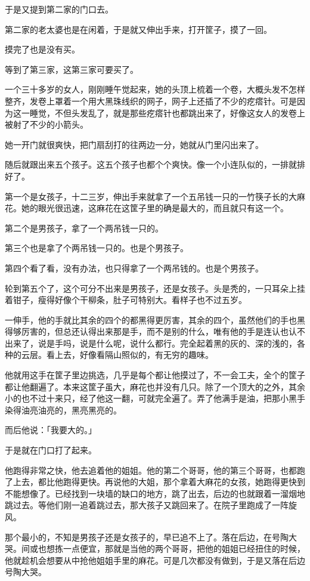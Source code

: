 \documentclass[UTF8]{ctexart}
\begin{document}
于是又提到第二家的门口去。

第二家的老太婆也是在闲着，于是就又伸出手来，打开筐子，摸了一回。

摸完了也是没有买。

等到了第三家，这第三家可要买了。

一个三十多岁的女人，刚刚睡午觉起来，她的头顶上梳着一个卷，大概头发不怎样整齐，发卷上罩着一个用大黑珠线织的网子，网子上还插了不少的疙瘩针。可是因为这一睡觉，不但头发乱了，就是那些疙瘩针也都跳出来了，好像这女人的发卷上被射了不少的小箭头。

她一开门就很爽快，把门扇刮打的往两边一分，她就从门里闪出来了。

随后就跟出来五个孩子。这五个孩子也都个个爽快。像一个小连队似的，一排就排好了。

第一个是女孩子，十二三岁，伸出手来就拿了一个五吊钱一只的一竹筷子长的大麻花。她的眼光很迅速，这麻花在这筐子里的确是最大的，而且就只有这一个。

第二个是男孩子，拿了一个两吊钱一只的。

第三个也是拿了个两吊钱一只的。也是个男孩子。

第四个看了看，没有办法，也只得拿了一个两吊钱的。也是个男孩子。

轮到第五个了，这个可分不出来是男孩子，还是女孩子。头是秃的，一只耳朵上挂着钳子，瘦得好像个干柳条，肚子可特别大。看样子也不过五岁。

一伸手，他的手就比其余的四个的都黑得更厉害，其余的四个，虽然他们的手也黑得够厉害的，但总还认得出来那是手，而不是别的什么，唯有他的手是连认也认不出来了，说是手吗，说是什么呢，说什么都行。完全起着黑的灰的、深的浅的，各种的云层。看上去，好像看隔山照似的，有无穷的趣味。

他就用这手在筐子里边挑选，几乎是每个都让他摸过了，不一会工夫，全个的筐子都让他翻遍了。本来这筐子虽大，麻花也并没有几只。除了一个顶大的之外，其余小的也不过十来只，经了他这一翻，可就完全遍了。弄了他满手是油，把那小黑手染得油亮油亮的，黑亮黑亮的。

而后他说：「我要大的。」

于是就在门口打了起来。

他跑得非常之快，他去追着他的姐姐。他的第二个哥哥，他的第三个哥哥，也都跑了上去，都比他跑得更快。再说他的大姐，那个拿着大麻花的女孩，她跑得更快到不能想像了。已经找到一块墙的缺口的地方，跳了出去，后边的也就跟着一溜烟地跳过去。等他们刚一追着跳过去，那大孩子又跳回来了。在院子里跑成了一阵旋风。

那个最小的，不知是男孩子还是女孩子的，早已追不上了。落在后边，在号陶大哭。间或也想拣一点便宜，那就是当他的两个哥哥，把他的姐姐已经扭住的时候，他就趁机会想要从中抢他姐姐手里的麻花。可是几次都没有做到，于是又落在后边号陶大哭。
\end{document}
